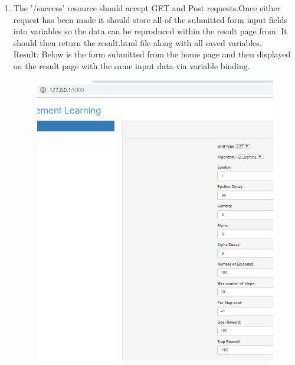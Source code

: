 \begin{enumerate}
	\item The '/success' resource should accept GET and Post requests.Once either request has been made it should store all of the submitted form input fields into variables so the data can be reproduced within the result page from. It should then return the result.html file along with all saved variables.\\
	Result: Below is the form submitted from the home page and then displayed on the result page with the same input data via variable binding.
	\begin{figure}[H]
		\centering
		\includegraphics[width=1\linewidth]{"img/Form home"}
		\caption{}
		\label{fig:form-home}
	\end{figure}
	\begin{figure}[H]
		\centering

\end{figure}
\end{enumerate}
